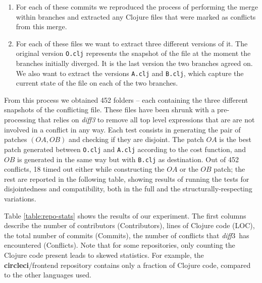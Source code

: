 \documentclass[11pt, titlepage]{article}
\newcommand{\diffthree}{\emph{diff3}\xspace}
\newcommand{\diff}{\emph{diff}}
\begin{document}
\begin{enumerate}
\item  For each of these commits we reproduced the process of performing the merge within branches and extracted any Clojure files that were marked as conflicts from this merge.

\item For each of these files we want to extract three different versions of it. The original version \texttt{O.clj} represents the snapshot of the file at the moment the branches initially diverged. It is the last version the two branches agreed on. We also want to extract the versions \texttt{A.clj} and \texttt{B.clj}, which capture the current state of the file on each of the two branches.
\end{enumerate}

From this process we obtained 452 folders -- each containing the three different snapshots of the conflicting file. These files have been shrunk with a pre-processing that relies on \diffthree to remove all top level expressions that are are not involved in a conflict in any way.
Each test consists in generating the pair of patches $(OA,OB)$ and checking if they are disjoint. 
The patch $OA$ is the best patch generated between \texttt{O.clj} and \texttt{A.clj} according to the cost function, and $OB$ is generated in the same way but with \texttt{B.clj} as destination.
Out of 452 conflicts, 18 timed out either while constructing the $OA$ or the $OB$ patch; the rest are reported in the following table, showing results of running the tests for disjointedness and compatibility, both in the full and the structurally-respecting variations.

Table \ref{table:repo-stats} shows the results of our experiment. The
first columns describe the number of contributors (Contributors), 
lines of Clojure code (LOC), the total number of commits (Commits), the number of conflicts that \diff3\ has encountered (Conflicts). Note that for
some repositories, only counting the Clojure code present leads to
skewed statistics. For example, the \textbf{circleci}/frontend
repository contains only a fraction of Clojure code, compared to the
other languages used.
\end{document}
